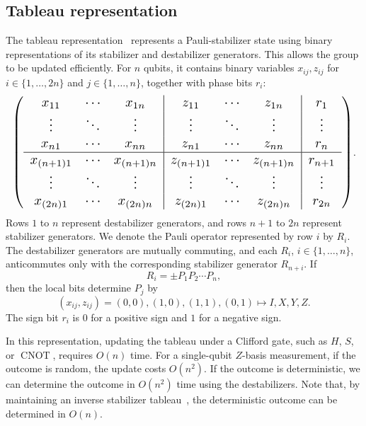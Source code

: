 \documentclass[
 reprint,
 amsmath,amssymb,
 pra,superscriptaddress, nofootinbib
]{revtex4-2}
\theoremstyle{definition}
\theoremstyle{plain}
\newcommand{\CNOT}{\operatorname{CNOT}}
\begin{document}
\subsection{Tableau representation}
The tableau representation~\cite{PhysRevA.70.052328} represents a Pauli-stabilizer state using binary representations of its stabilizer and destabilizer generators. This allows the group to be updated efficiently. For $n$ qubits, it contains binary variables $x_{ij},z_{ij}$ for $i\in\{1,\ldots,2n\}$ and $j\in\{1,\ldots,n\}$, together with phase bits $r_i$:
\begin{equation}
\resizebox{\columnwidth}{!}{$
\left(\begin{array}{ccc|ccc|c}
 x_{11}&\cdots&x_{1n}&z_{11}&\cdots&z_{1n}&r_1\\
 \vdots&\ddots&\vdots&\vdots&\ddots&\vdots&\vdots\\
 x_{n1}&\cdots&x_{nn}&z_{n1}&\cdots&z_{nn}&r_n\\\hline
 x_{(n+1)1}&\cdots&x_{(n+1)n}&z_{(n+1)1}&\cdots&z_{(n+1)n}&r_{n+1}\\
 \vdots&\ddots&\vdots&\vdots&\ddots&\vdots&\vdots\\
 x_{(2n)1}&\cdots&x_{(2n)n}&z_{(2n)1}&\cdots&z_{(2n)n}&r_{2n}
\end{array}\right)$}.
\end{equation}
Rows $1$ to $n$ represent destabilizer generators, and rows $n+1$ to $2n$ represent stabilizer generators.  We denote the Pauli operator represented by row $i$ by $R_i$. The destabilizer generators are mutually commuting, and each $R_i$, $i\in\{1,\ldots,n\}$, anticommutes only with the corresponding stabilizer generator $R_{n+i}$. If
\begin{equation}
R_i=\pm P_1P_2\cdots P_n,
\end{equation}
then the local bits determine $P_j$ by
\begin{equation}
(x_{ij},z_{ij})=(0,0),(1,0),(1,1),(0,1)
\mapsto I,X,Y,Z.
\end{equation}
The sign bit $r_i$ is $0$ for a positive sign and $1$ for a negative sign.

In this representation, updating the tableau under a Clifford gate, such as $H$, $S$, or
$\CNOT$, requires $O(n)$ time. 
For a single-qubit $Z$-basis measurement, if the outcome is random, the update costs $O(n^2)$.
If the outcome is deterministic, we can determine the outcome in $O(n^2)$ time using the destabilizers.
Note that, by maintaining an inverse stabilizer tableau~\cite{Gidney2021stimfaststabilizer}, the deterministic outcome can be determined in $O(n)$. 
\end{document}

